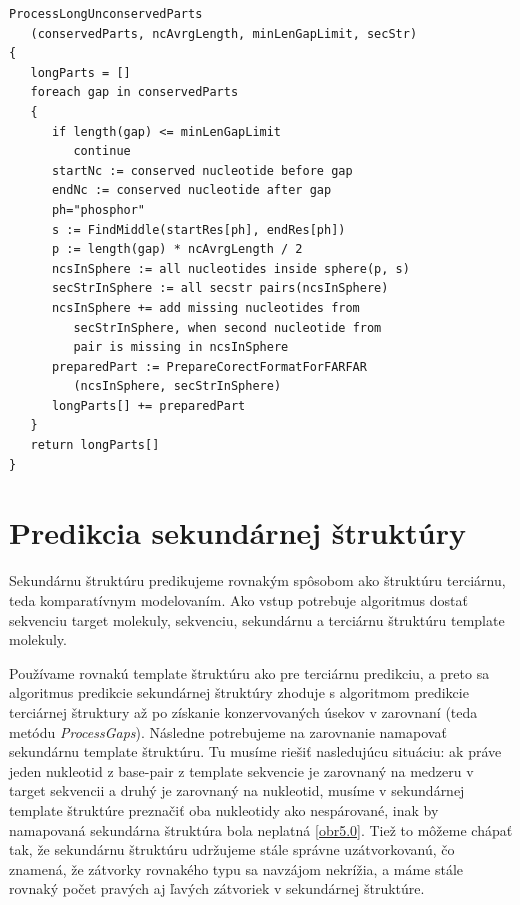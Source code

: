 \begin{lstlisting}
ProcessLongUnconservedParts
   (conservedParts, ncAvrgLength, minLenGapLimit, secStr)
{
   longParts = []
   foreach gap in conservedParts
   {
      if length(gap) <= minLenGapLimit
         continue
      startNc := conserved nucleotide before gap
      endNc := conserved nucleotide after gap
      ph="phosphor"
      s := FindMiddle(startRes[ph], endRes[ph])
      p := length(gap) * ncAvrgLength / 2
      ncsInSphere := all nucleotides inside sphere(p, s)
      secStrInSphere := all secstr pairs(ncsInSphere)
      ncsInSphere += add missing nucleotides from
         secStrInSphere, when second nucleotide from 
         pair is missing in ncsInSphere
      preparedPart := PrepareCorectFormatForFARFAR
         (ncsInSphere, secStrInSphere)
      longParts[] += preparedPart
   }
   return longParts[]
}
\end{lstlisting}


\section{Predikcia sekundárnej štruktúry}
Sekundárnu štruktúru predikujeme rovnakým spôsobom ako štruktúru terciárnu, teda komparatívnym modelovaním. Ako vstup potrebuje algoritmus dostať sekvenciu target molekuly, sekvenciu, sekundárnu  a terciárnu štruktúru template molekuly. 


\indent  Používame rovnakú template štruktúru ako pre terciárnu predikciu, a preto sa algoritmus predikcie sekundárnej štruktúry zhoduje s algoritmom predikcie terciárnej štruktury až po získanie konzervovaných úsekov v zarovnaní (teda metódu \textit{ProcessGaps}). Následne potrebujeme na zarovnanie namapovať sekundárnu template štruktúru. Tu musíme riešiť nasledujúcu situáciu: ak práve jeden nukleotid z base-pair z template sekvencie je zarovnaný na medzeru v target sekvencii a druhý je zarovnaný na nukleotid, musíme v sekundárnej template štruktúre preznačiť oba nukleotidy ako nespárované, inak by namapovaná sekundárna štruktúra bola neplatná \autoref{obr5.0}. Tiež to môžeme chápať tak, že sekundárnu štruktúru udržujeme stále správne uzátvorkovanú, čo znamená, že zátvorky rovnakého typu sa navzájom nekrížia, a máme stále rovnaký počet pravých aj ľavých zátvoriek v sekundárnej štruktúre.


